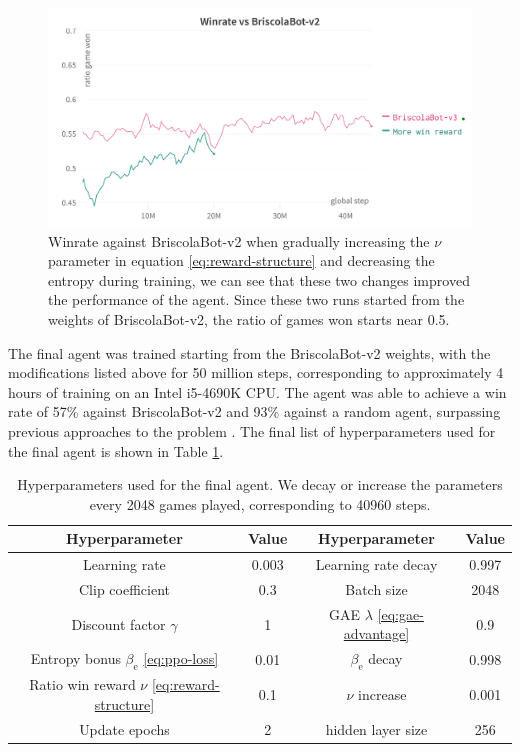 \begin{figure}[H]
    \centering
    \includegraphics[width=\textwidth]{images/briscolabot-v3.png}
    \caption{Winrate against BriscolaBot-v2 when gradually increasing the $\nu$ parameter in equation \eqref{eq:reward-structure} and decreasing the entropy during training, we can see that these two changes improved the performance of the agent. Since these two runs started from the weights of BriscolaBot-v2, the ratio of games won starts near 0.5.}
    \label{fig:briscolabot-v3}
\end{figure}

The final agent was trained starting from the BriscolaBot-v2 weights, with the modifications listed above for 50 million steps, corresponding to approximately 4 hours of training on an Intel i5-4690K CPU. The agent was able to achieve a win rate of 57\% against BriscolaBot-v2 and 93\% against a random agent, surpassing previous approaches to the problem \cite{alsora-deep-briscola-dqn}. The final list of hyperparameters used for the final agent is shown in Table \ref{tab:hyperparam-final}.

\begin{table}[H]
    \centering
    \begin{tabular}{cccc}
        \hline
        Hyperparameter                                       & Value & Hyperparameter                         & Value \\
        \hline
        Learning rate                                        & 0.003 & Learning rate decay                    & 0.997 \\
        Clip coefficient                                     & 0.3   & Batch size                             & 2048  \\
        Discount factor $\gamma$                             & 1     & GAE $\lambda$ \eqref{eq:gae-advantage} & 0.9   \\
        Entropy bonus $\beta_\textrm{e}$ \eqref{eq:ppo-loss} & 0.01  & $\beta_\textrm{e}$ decay               & 0.998 \\
        Ratio win reward $\nu$ \eqref{eq:reward-structure}   & 0.1   & $\nu$ increase                         & 0.001 \\
        Update epochs                                        & 2     & hidden layer size                      & 256
    \end{tabular}
    \caption{Hyperparameters used for the final agent. We decay or increase the parameters every 2048 games played, corresponding to 40960 steps.}
    \label{tab:hyperparam-final}
\end{table}

